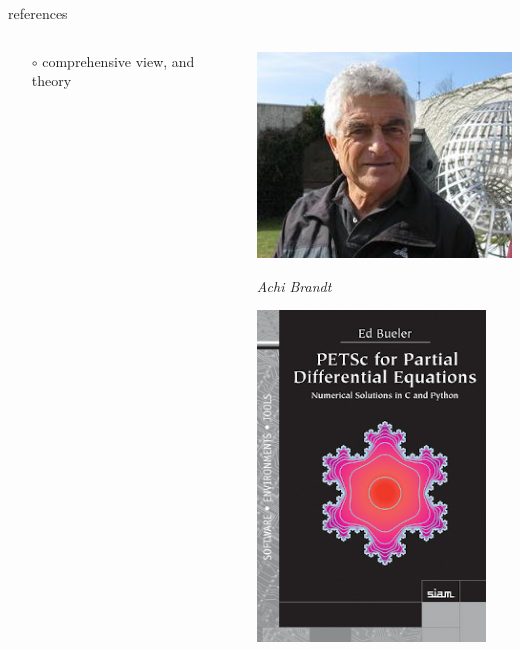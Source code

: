 \documentclass[10pt,
               svgnames,
               hyperref={colorlinks,citecolor=DeepPink4,linkcolor=FireBrick,urlcolor=Maroon},
               usepdftitle=false]{beamer}
\begin{document}
\begin{frame}{references}
\begin{columns}
\begin{column}{0.8\textwidth}
\begin{itemize}
\begin{itemize}
    \item[$\circ$] comprehensive view, and theory
    \end{itemize}
\end{itemize}
\end{column}
\begin{column}{0.17\textwidth}
\hfill \includegraphics[width=\textwidth]{images/abrandt.jpg}

\hfill {\scriptsize \emph{Achi Brandt}}

\vspace{7mm}
\hfill \includegraphics[width=0.9\textwidth]{images/bueler.jpg}


\end{column}
\end{columns}
\end{frame}
\end{document}
